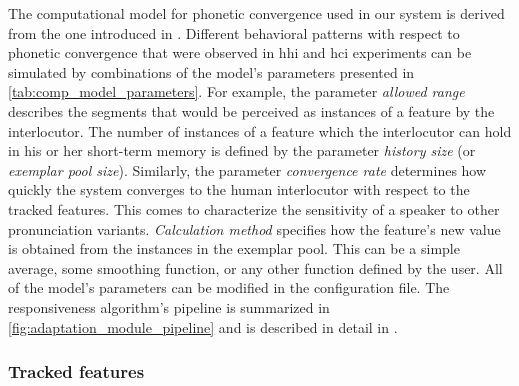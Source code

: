 The computational model for phonetic convergence used in our system is derived from the one introduced in \citet{Raveh2017Interspeech}.
Different behavioral patterns with respect to phonetic convergence that were observed in \ac{hhi} and \ac{hci} experiments \citep{Cohen2017converging, Gessinger2017Interspeech, Schweitzer2016exemplar, Babel2010dialect} can be simulated by combinations of the model's parameters presented in \cref{tab:comp_model_parameters}.
For example, the parameter \emph{allowed range} describes the segments that would be perceived as instances of a feature by the interlocutor.
The number of instances of a feature which the interlocutor can hold in his or her short-term memory is defined by the parameter \emph{history size} (or \emph{exemplar pool size}).
Similarly, the parameter \emph{convergence rate} determines how quickly the system converges to the human interlocutor with respect to the tracked features.
This comes to characterize the sensitivity of a speaker to other pronunciation variants.
\emph{Calculation method} specifies how the feature's new value is obtained from the instances in the exemplar pool.
This can be a simple average, some smoothing function, or any other function defined by the user.
All of the model's parameters can be modified in the configuration file.
The responsiveness algorithm's pipeline is summarized in \cref{fig:adaptation_module_pipeline} and is described in detail in \citet{Raveh2017Interspeech}.

\subsubsection{Tracked features}
\label{subsubsec:tracked_features}

